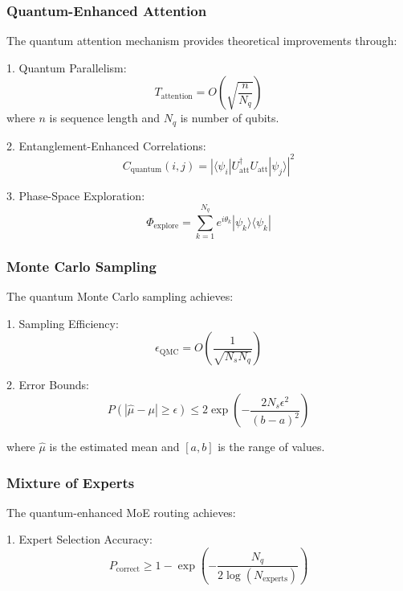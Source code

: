 \documentclass{article}
\begin{document}
\subsubsection{Quantum-Enhanced Attention}
The quantum attention mechanism provides theoretical improvements through:

1. Quantum Parallelism:
\begin{equation}
T_{\text{attention}} = O\left(\sqrt{\frac{n}{N_q}}\right)
\end{equation}
where $n$ is sequence length and $N_q$ is number of qubits.

2. Entanglement-Enhanced Correlations:
\begin{equation}
C_{\text{quantum}}(i,j) = |\langle\psi_i|U_{\text{att}}^\dagger U_{\text{att}}|\psi_j\rangle|^2
\end{equation}

3. Phase-Space Exploration:
\begin{equation}
\Phi_{\text{explore}} = \sum_{k=1}^{N_q} e^{i\theta_k}|\psi_k\rangle\langle\psi_k|
\end{equation}

\subsubsection{Monte Carlo Sampling}
The quantum Monte Carlo sampling achieves:

1. Sampling Efficiency:
\begin{equation}
\epsilon_{\text{QMC}} = O\left(\frac{1}{\sqrt{N_s N_q}}\right)
\end{equation}

2. Error Bounds:
\begin{equation}
P(|\hat{\mu} - \mu| \geq \epsilon) \leq 2\exp\left(-\frac{2N_s\epsilon^2}{(b-a)^2}\right)
\end{equation}

where $\hat{\mu}$ is the estimated mean and $[a,b]$ is the range of values.

\subsubsection{Mixture of Experts}
The quantum-enhanced MoE routing achieves:

1. Expert Selection Accuracy:
\begin{equation}
P_{\text{correct}} \geq 1 - \exp\left(-\frac{N_q}{2\log(N_{\text{experts}})}\right)
\end{equation}
\end{document}
